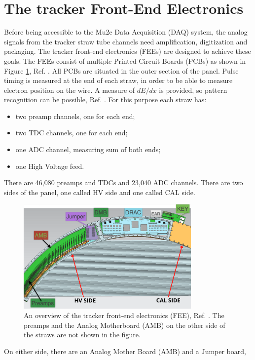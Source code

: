 \section{The tracker Front-End Electronics}
Before being accessible to the Mu2e Data Acquisition (DAQ) system, the analog signals 
from the tracker straw tube channels need amplification, digitization and packaging. 
The tracker front-end electronics (FEEs) are designed to achieve these goals. The FEEs 
consist of multiple Printed Circuit Boards (PCBs) as shown in Figure \ref{fig:trackerfee}, Ref. \cite{vadimmu2e}.
All PCBs are situated in the outer section of the panel. Pulse timing is measured at the 
end of each straw, in order to be able to measure electron position on the wire. A measure 
of $dE/dx$ is provided, so pattern recognition can be possible, Ref. \cite{bartoszek2015mu2e}. For this purpose each straw has:
\begin{itemize}
    \item two preamp channels, one for each end;
    \item two TDC channels, one for each end;
    \item one ADC channel, measuring sum of both ends;
    \item one High Voltage feed.
\end{itemize}
There are 46,080 preamps and TDCs and 23,040 ADC channels. There are two sides of the panel, one called HV side and one called CAL side. 
\begin{figure}[!h]
\centering
\includegraphics[width =0.8\textwidth]{figures/png/Screenshot_20240131_111836.png}
\caption{An overview of the tracker front-end electronics (FEE), Ref.  
\cite{vadimmu2e}. The preamps and the Analog Motherboard (AMB) 
on the other side of the straws are not shown in the figure.}
\label{fig:trackerfee}
\end{figure}
On either side, there are an Analog Mother Board (AMB) and a Jumper board, 
